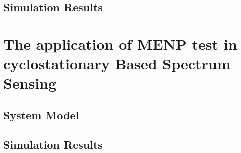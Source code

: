 \documentclass{report}
\begin{document}
\begin{spacing}{2.0}
\subsection{Simulation Results}
\section{The application of MENP test in cyclostationary Based Spectrum Sensing}
\subsection{System Model}
\subsection{Simulation Results}

\newpage
\end{spacing}
\end{document}
